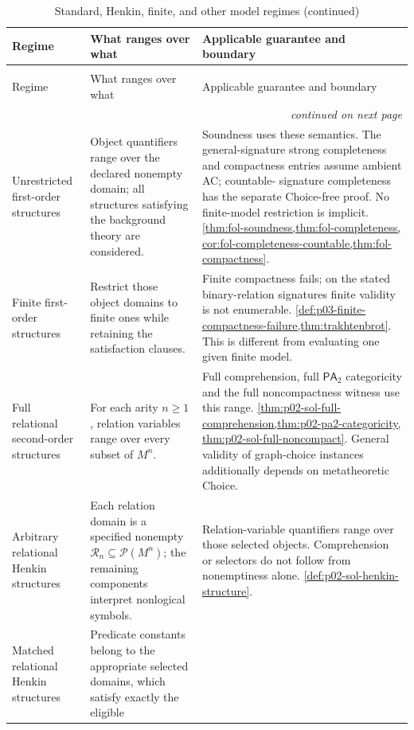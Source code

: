 \begin{longtable}{@{}p{}p{}p{}@{}}
\caption{Standard, Henkin, finite, and other model regimes}\\
\toprule
Regime & What ranges over what & Applicable guarantee and boundary \\
\midrule
\endfirsthead
\caption[]{Standard, Henkin, finite, and other model regimes (continued)}\\
\toprule
Regime & What ranges over what & Applicable guarantee and boundary \\
\midrule
\endhead
\midrule\multicolumn{3}{r}{\emph{continued on next page}}\\
\endfoot
\endlastfoot
Unrestricted first-order structures & Object quantifiers range over the
declared nonempty domain; all structures satisfying the background theory
are considered. & Soundness uses these semantics. The general-signature
strong completeness and compactness entries assume ambient AC; countable-
signature completeness has the separate Choice-free proof. No finite-model
restriction is implicit.
\cref{thm:fol-soundness,thm:fol-completeness,
cor:fol-completeness-countable,thm:fol-compactness}. \\
Finite first-order structures & Restrict those object domains to finite
ones while retaining the satisfaction clauses. & Finite compactness fails;
on the stated binary-relation signatures finite validity is not enumerable.
\cref{def:p03-finite-compactness-failure,thm:trakhtenbrot}. This is
different from evaluating one given finite model. \\
Full relational second-order structures & For each arity \(n\geq1\),
relation variables range over every subset of \(M^n\). & Full
comprehension, full \(\mathsf{PA}_2\) categoricity and the full
noncompactness witness use this range.
\cref{thm:p02-sol-full-comprehension,thm:p02-pa2-categoricity,
thm:p02-sol-full-noncompact}. General validity of graph-choice instances
additionally depends on metatheoretic Choice. \\
Arbitrary relational Henkin structures & Each relation domain is a
specified nonempty \(\mathcal R_n\subseteq\mathcal P(M^n)\);
the remaining components interpret nonlogical symbols. & Relation-variable
quantifiers range over
those selected objects. Comprehension or selectors do not follow from
nonemptiness alone. \cref{def:p02-sol-henkin-structure}. \\
Matched relational Henkin structures & Predicate constants belong to the
appropriate selected domains, which satisfy exactly the eligible

\end{longtable}
